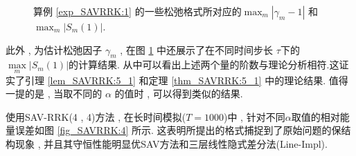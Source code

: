 \begin{figure}[H]
	\begin{center}
	\caption{算例 \ref{exp_SAVRRK:1} 的一些松弛格式所对应的$\max_m\left|\gamma_m-1\right|$ 和 $\max_m\left|S_m(1)\right|$.}
	\label{fig_SAVRRK:1}
	\end{center}
	\end{figure}

	此外 , 为估计松弛因子 $\gamma_m$ , 在图 \ref{fig_SAVRRK:1} 中还展示了在不同时间步长 $\tau$下的 $\max\limits _m\left|S_m(1)\right|$的计算结果.
	从中可以看出上述两个量的阶数与理论分析相符.这证实了引理 \ref{lem_SAVRRK:5_1} 和定理 \ref{thm_SAVRRK:5_1} 中的理论结果.
	值得一提的是 , 当取不同的 $\alpha$ 的值时 , 可以得到类似的结果.%
	
	使用SAV-RRK(4 , 4)方法 , 在长时间模拟($T=1000$)中 , 针对不同$\alpha$取值的相对能量误差如图 \ref{fig_SAVRRK:4} 所示.
	这表明所提出的格式捕捉到了原始问题的保结构现象 , 并且其守恒性能明显优SAV方法\cite{chengConvergenceEnergyconservingScheme2022}和三层线性隐式差分法(Line-Impl)\cite{wangConservativeLinearizedDifference2015}.
			
